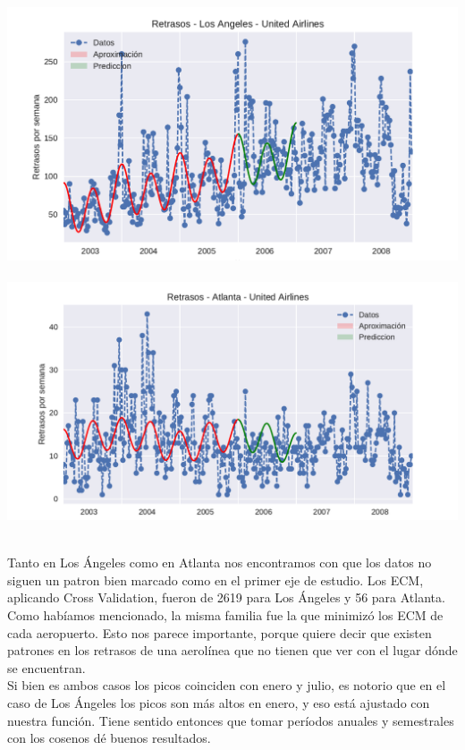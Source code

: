 {\centering
  \includegraphics[width=1.0\linewidth]{informe/imagenes/retrasosUnitedAirlinesLAvol3.pdf}
}
$ $\newline
{\centering
  \includegraphics[width=1.0\linewidth]{informe/imagenes/retrasosUnitedAirlinesATLvol3.pdf}
}
$ $\newline

Tanto en Los Ángeles como en Atlanta nos encontramos con que los datos no siguen un patron bien marcado como en el primer eje de estudio. Los ECM, aplicando Cross Validation, fueron de 2619 para Los Ángeles y 56 para Atlanta.
Como habíamos mencionado, la misma familia fue la que minimizó los ECM de cada aeropuerto. Esto nos parece importante, porque quiere decir que existen patrones en los retrasos de una aerolínea que no tienen que ver con el lugar dónde se encuentran. \\

Si bien es ambos casos los picos coinciden con enero y julio, es notorio que en el caso de Los Ángeles los picos son más altos en enero, y eso está ajustado con nuestra función. Tiene sentido entonces que tomar períodos anuales y semestrales con los cosenos dé buenos resultados. \\

